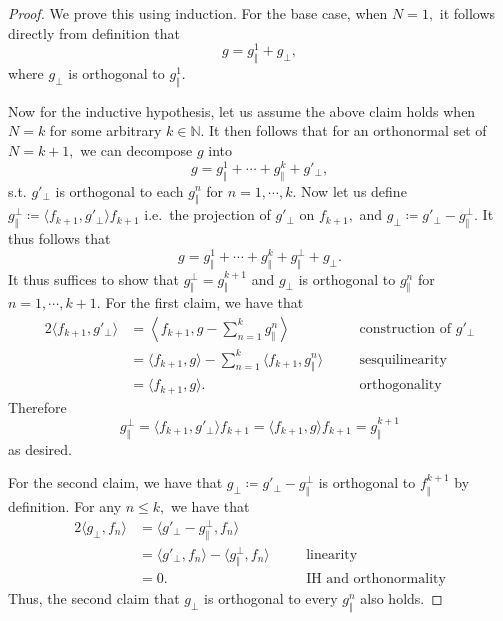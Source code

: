 \documentclass[10pt]{article}
\begin{document}
\begin{proof}
    We prove this using induction. For the base case, when $N=1,$ it follows directly from definition that
    \[g = g^1_\Vert + g_\perp,\]
    where $g_\perp$ is orthogonal to $g_\Vert^1.$
    
    Now for the inductive hypothesis, let us assume the above claim holds when $N=k$ for some arbitrary $k\in\mathbb{N}.$
    It then follows that for an orthonormal set of $N=k+1,$ we can decompose $g$ into
    \[g = g^1_\Vert + \cdots + g^k_\Vert + g'_\perp,\]
    s.t. $g'_\perp$ is orthogonal to each $g^n_\Vert$ for $n=1,\cdots,k.$
    Now let us define $g_{\Vert}^\perp \coloneqq \langle f_{k+1},g'_\perp\rangle f_{k+1}$ i.e.~the projection of  $g'_\perp$ on $f_{k+1},$ and $g_\perp \coloneqq g'_\perp - g_\Vert^\perp.$
    It thus follows that
    \[g = g^1_\Vert + \cdots + g^k_\Vert + g_\Vert^\perp + g_\perp.\]
    It thus suffices to show that $g_\Vert^\perp = g^{k+1}_\Vert$ and $g_\perp$ is orthogonal to $g_\Vert^n$ for $n=1,\cdots,k+1.$ For the first claim, we have that
    \begin{alignat*}{2}
        \langle f_{k+1}, g'_\perp \rangle &= \left\langle f_{k+1}, g - \sum_{n=1}^{k}g_\Vert^n \right\rangle &&\text{construction of $g'_\perp$}\\
        &= \langle f_{k+1}, g\rangle - \sum_{n=1}^{k}\langle f_{k+1}, g_\Vert^n\rangle \quad&&\text{sesquilinearity}\\
        &= \langle f_{k+1}, g\rangle. &&\text{orthogonality}
    \end{alignat*}
    Therefore
    \[g_\Vert^\perp = \langle f_{k+1}, g'_\perp \rangle f_{k+1} = \langle f_{k+1}, g \rangle f_{k+1} = g_\Vert^{k+1} \]
    as desired.

    For the second  claim, we have that $g_\perp \coloneqq g'_\perp - g_\Vert^\perp$ is orthogonal to $f_\Vert^{k+1}$ by definition. For any $n\le k,$ we have that
    \begin{alignat*}{2}
        \langle g_\perp, f_n\rangle &= \langle g'_\perp - g_\Vert^\perp, f_n\rangle\\
        &=  \langle g'_\perp , f_n\rangle -  \langle g_\Vert^\perp, f_n\rangle \quad&&\text{linearity}\\
        &= 0. &&\text{IH and orthonormality}
    \end{alignat*}
    Thus, the second claim that $g_\perp$ is orthogonal to every $g_\Vert^n$ also holds.
\end{proof}
\end{document}
